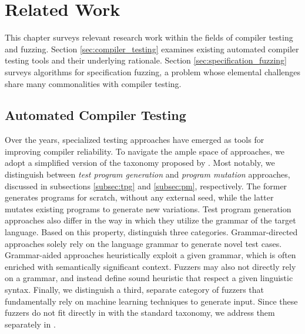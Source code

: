 \chapter{\label{cha:related}Related Work}

This chapter surveys relevant research work within
the fields of compiler testing and fuzzing.
Section \ref{sec:compiler_testing} examines existing
automated compiler testing tools and their underlying rationale.
Section \ref{sec:specification_fuzzing} surveys algorithms
for specification fuzzing, a problem whose elemental challenges
share many commonalities with compiler testing. 

\section{\label{sec:compiler_testing}Automated Compiler Testing}



Over the years, specialized testing approaches have emerged
as tools for improving compiler reliability.
To navigate the ample space of approaches, we adopt a simplified
version of the taxonomy proposed by \citet{chen2020survey}. 
Most notably, we distinguish between \textit{test program generation}
and \textit{program mutation} approaches, discussed
in subsections \ref{subsec:tpg} and \ref{subsec:pm}, respectively.
The former generates programs for scratch, without any
external seed, while the latter mutates existing programs to generate
new variations. 
Test program generation approaches also differ in the way in which they
utilize the grammar of the target language.
Based on this property, \citet{chen2020survey} distinguish three
categories.
Grammar-directed approaches solely rely on the
language grammar to generate novel test cases.
Grammar-aided approaches heuristically exploit a given
grammar, which is often enriched with semantically
significant context. 
Fuzzers may also not directly rely on a grammar,
and instead define sound heuristic that respect
a given linguistic syntax.
Finally, we distinguish a third, separate category of fuzzers
that fundamentally rely on machine learning techniques to generate input.
Since these fuzzers do not fit directly
in with the standard taxonomy, we address them separately in .



